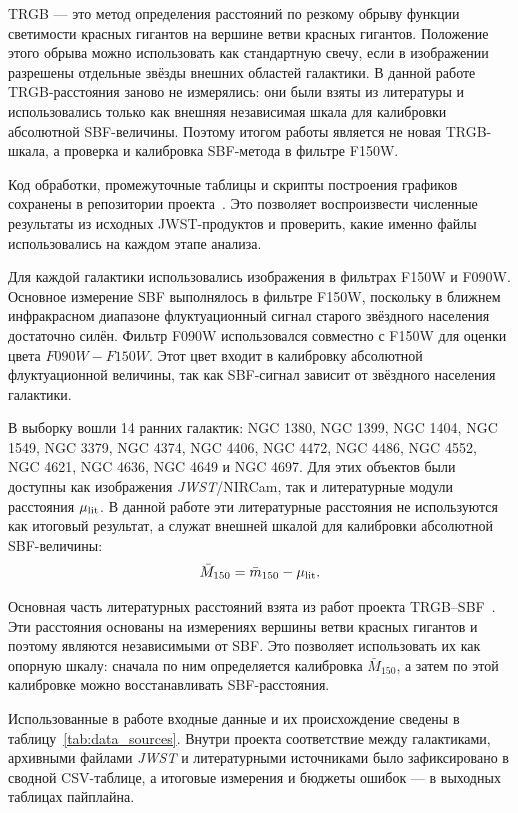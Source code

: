 \documentclass[12pt,a4paper]{article}
\begin{document}
TRGB --- это метод определения расстояний по резкому обрыву функции светимости красных гигантов на вершине ветви красных гигантов. Положение этого обрыва можно использовать как стандартную свечу, если в изображении разрешены отдельные звёзды внешних областей галактики. В данной работе TRGB-расстояния заново не измерялись: они были взяты из литературы и использовались только как внешняя независимая шкала для калибровки абсолютной SBF-величины. Поэтому итогом работы является не новая TRGB-шкала, а проверка и калибровка SBF-метода в фильтре F150W.

Код обработки, промежуточные таблицы и скрипты построения графиков сохранены в репозитории проекта~\cite{GitHubRepo}. Это позволяет воспроизвести численные результаты из исходных JWST-продуктов и проверить, какие именно файлы использовались на каждом этапе анализа.

Для каждой галактики использовались изображения в фильтрах F150W и F090W. Основное измерение SBF выполнялось в фильтре F150W, поскольку в ближнем инфракрасном диапазоне флуктуационный сигнал старого звёздного населения достаточно силён. Фильтр F090W использовался совместно с F150W для оценки цвета $F090W-F150W$. Этот цвет входит в калибровку абсолютной флуктуационной величины, так как SBF-сигнал зависит от звёздного населения галактики.

В выборку вошли 14 ранних галактик: NGC 1380, NGC 1399, NGC 1404, NGC 1549, NGC 3379, NGC 4374, NGC 4406, NGC 4472, NGC 4486, NGC 4552, NGC 4621, NGC 4636, NGC 4649 и NGC 4697. Для этих объектов были доступны как изображения \textit{JWST}/NIRCam, так и литературные модули расстояния $\mu_{\rm lit}$. В данной работе эти литературные расстояния не используются как итоговый результат, а служат внешней шкалой для калибровки абсолютной SBF-величины:
\begin{equation}
    \bar{M}_{150} = \bar{m}_{150} - \mu_{\rm lit}.
\end{equation}

Основная часть литературных расстояний взята из работ проекта TRGB--SBF~\cite{Anand2024,Jensen2025,Chazov2026}. Эти расстояния основаны на измерениях вершины ветви красных гигантов и поэтому являются независимыми от SBF. Это позволяет использовать их как опорную шкалу: сначала по ним определяется калибровка $\bar{M}_{150}$, а затем по этой калибровке можно восстанавливать SBF-расстояния.

Использованные в работе входные данные и их происхождение сведены в таблицу~\ref{tab:data_sources}. Внутри проекта соответствие между галактиками, архивными файлами \textit{JWST} и литературными источниками было зафиксировано в сводной CSV-таблице, а итоговые измерения и бюджеты ошибок --- в выходных таблицах пайплайна.
\end{document}
